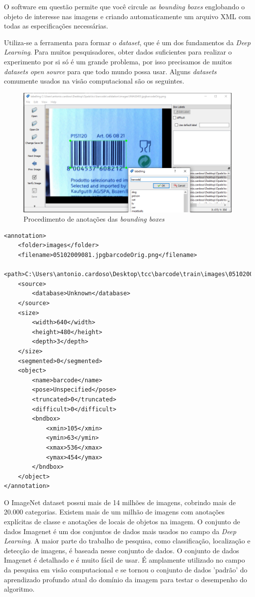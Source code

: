 O software em questão permite que você circule as \textit{bounding boxes} englobando o objeto de interesse nas imagens e criando automaticamente um arquivo XML com todas as especificações necessárias.

Utiliza-se a ferramenta para formar o \textit{dataset}, que é um dos fundamentos da \textit{Deep Learning}. Para muitos pesquisadores, obter dados suficientes para realizar o experimento por si só é um grande problema, por isso precisamos de muitos \textit{datasets open source} para que todo mundo possa usar. Alguns \textit{datasets} comumente usados na visão computacional são os seguintes.

\begin{figure}[htbp]
	\centering
	\includegraphics[width=0.9\linewidth]{figuras/MachineLearning/labelimg.png}
	\caption{Procedimento de anotações das \textit{bounding boxes}}
	\label{fig:labelimg}
\end{figure}

\begin{lstlisting}[caption=Arquivo XML gerado pelo LabelImg, label=cod:XML]
<annotation>
	<folder>images</folder>
	<filename>05102009081.jpgbarcodeOrig.png</filename>
	<path>C:\Users\antonio.cardoso\Desktop\tcc\barcode\train\images\05102009081.jpgbarcodeOrig.png</path>
	<source>
		<database>Unknown</database>
	</source>
	<size>
		<width>640</width>
		<height>480</height>
		<depth>3</depth>
	</size>
	<segmented>0</segmented>
	<object>
		<name>barcode</name>
		<pose>Unspecified</pose>
		<truncated>0</truncated>
		<difficult>0</difficult>
		<bndbox>
			<xmin>105</xmin>
			<ymin>63</ymin>
			<xmax>536</xmax>
			<ymax>454</ymax>
		</bndbox>
	</object>
</annotation>
\end{lstlisting}

O ImageNet dataset \cite{deng2009imagenet} possui mais de 14 milhões de imagens, cobrindo mais de 20.000 categorias. Existem mais de um milhão de imagens com anotações explícitas de classe e anotações de locais de objetos na imagem. O conjunto de dados Imagenet é um dos conjuntos de dados mais usados no campo da \textit{Deep Learning}. A maior parte do trabalho de pesquisa, como classificação, localização e detecção de imagens, é baseada nesse conjunto de dados. O conjunto de dados Imagenet é detalhado e é muito fácil de usar. É amplamente utilizado no campo da pesquisa em visão computacional e se tornou o conjunto de dados 'padrão' do aprendizado profundo atual do domínio da imagem para testar o desempenho do algoritmo. \cite{zhou2017application}

